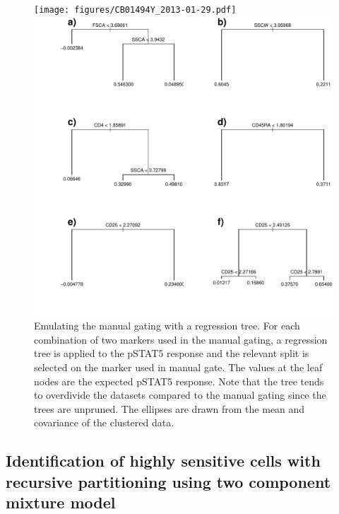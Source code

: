 \hspace{-2cm}
\begin{figure}[h]
\centering
\texttt{[image: figures/CB01494Y\_2013-01-29.pdf]}
\includegraphics[scale=.4]{figures/tree-CB01494Y_2013-01-29.pdf}
{ Emulating the manual gating with a regression tree. }
{
  For each combination of two markers used in the manual gating, a regression tree is applied to the pSTAT5 response and the relevant split is selected
  on the marker used in manual gate.
  The values at the leaf nodes are the expected pSTAT5 response.
  Note that the tree tends to overdivide the datasets compared to the manual gating since the trees are unpruned.
  The ellipses are drawn from the mean and covariance of the clustered data.
}

\end{figure}




\subsection{Identification of highly sensitive cells with recursive partitioning using two component mixture model}

